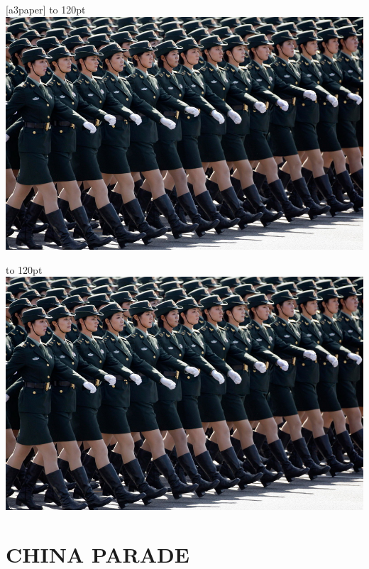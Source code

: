 \documentclass[twoside,a4paper]{book}
\makeatletter
\providecommand{\cleartoevenpage}[1][\@empty]{%
 \clearpage%
 \ifodd\c@page\null#1\clearpage\fi}
\makeatother
\begin{document}
\mainmatter
\null\newpage
{}[a3paper]
\cleartoevenpage
\checkoddpage%
{\parindent0pt
\vbox to 120pt{\lipsum[1]}%
\includegraphics[height=0.78\textheight]{china-05}}

{\parindent0pt
\vbox to 120pt{\lipsum[1]}%
\hspace*{\dimexpr(-2in-\textwidth-2\evensidemargin)}
\includegraphics[height=0.78\textheight]{china-05}}
\hspace{2.8em}\parbox[b]{0.571\textwidth}{%
\section*{\hfill CHINA PARADE \hfill\hfill}
\lipsum[1-3]}
\end{document}
